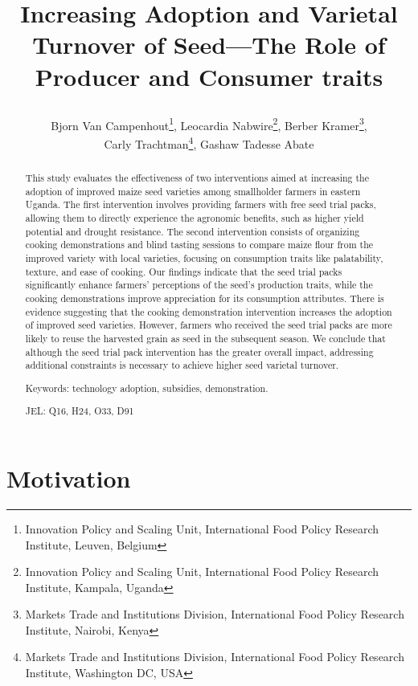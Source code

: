 \documentclass[english]{article}\usepackage[]{graphicx}\usepackage[]{xcolor}
\begin{document}
\title{\author{Bjorn Van Campenhout\thanks{Innovation Policy and Scaling Unit, International Food Policy Research Institute, Leuven, Belgium}, Leocardia Nabwire\thanks{Innovation Policy and Scaling Unit, International Food Policy Research Institute, Kampala, Uganda}, Berber Kramer\thanks{Markets Trade and Institutions Division, International Food Policy Research Institute, Nairobi, Kenya}, \\ Carly Trachtman\thanks{Markets Trade and Institutions Division, International Food Policy Research Institute, Washington DC, USA}, Gashaw Tadesse Abate\footnotemark[4]}Increasing
Adoption and Varietal Turnover of Seed---The Role of Producer and
Consumer traits}
\maketitle
\begin{abstract}
This study evaluates the effectiveness of two interventions aimed
at increasing the adoption of improved maize seed varieties among
smallholder farmers in eastern Uganda. The first intervention involves
providing farmers with free seed trial packs, allowing them to directly
experience the agronomic benefits, such as higher yield potential
and drought resistance. The second intervention consists of organizing
cooking demonstrations and blind tasting sessions to compare maize
flour from the improved variety with local varieties, focusing on
consumption traits like palatability, texture, and ease of cooking.
Our findings indicate that the seed trial packs significantly enhance
farmers' perceptions of the seed's production traits, while the cooking
demonstrations improve appreciation for its consumption attributes.
There is evidence suggesting that the cooking demonstration intervention
increases the adoption of improved seed varieties. However, farmers
who received the seed trial packs are more likely to reuse the harvested
grain as seed in the subsequent season. We conclude that although
the seed trial pack intervention has the greater overall impact, addressing
additional constraints is necessary to achieve higher seed varietal
turnover.

Keywords: technology adoption, subsidies, demonstration.

JEL: Q16, H24, O33, D91
\end{abstract}

\section{Motivation}
\end{document}

